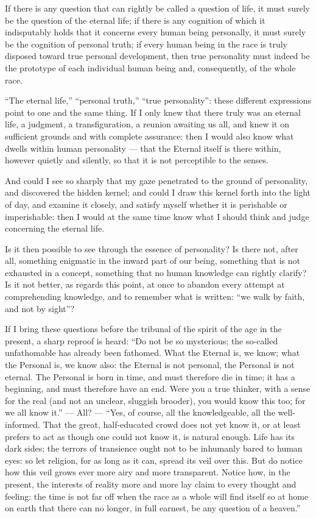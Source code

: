 \documentclass[12pt,a4paper]{book}
\begin{document}
If there is any question that can rightly be called a question of life, it must surely be the question of the eternal life; if there is any cognition of which it indisputably holds that it concerns every human being personally, it must surely be the cognition of personal truth; if every human being in the race is truly disposed toward true personal development, then true personality must indeed be the prototype of each individual human being and, consequently, of the whole race.

``The eternal life,'' ``personal truth,'' ``true personality'': these different expressions point to one and the same thing. If I only knew that there truly was an eternal life, a judgment, a transfiguration, a reunion awaiting us all, and knew it on sufficient grounds and with complete assurance: then I would also know what dwells within human personality --- that the Eternal itself is there within, however quietly and silently, so that it is not perceptible to the senses.

And could I see so sharply that my gaze penetrated to the ground of personality, and discovered the hidden kernel; and could I draw this kernel forth into the light of day, and examine it closely, and satisfy myself whether it is
perishable or imperishable: then I would at the same time know what I should think and judge concerning the eternal life.

Is it then possible to see through the essence of personality? Is there not, after all, something enigmatic in the inward part of our being, something that is not exhausted in a concept, something that no human knowledge can rightly clarify? Is it not better, as regards this point, at once to abandon every attempt at comprehending knowledge, and to remember what is written: ``we walk by faith, and not by sight''?

If I bring these questions before the tribunal of the spirit of the age in the present, a sharp reproof is heard: ``Do not be so mysterious; the so-called unfathomable has already been fathomed. What the Eternal is, we know; what the Personal is, we know also: the Eternal is not personal, the Personal is not eternal. The Personal is born in time, and must therefore die in time; it has a beginning, and must therefore have an end. Were you a true thinker, with a sense for the real (and not an unclear, sluggish brooder), you would know this too; for we all know it.'' --- All? --- ``Yes, of course, all the knowledgeable, all the well-informed. That the great, half-educated crowd does not yet know it, or at least prefers to act as though one could not know it, is natural enough. Life has its dark sides; the terrors of transience ought not to be inhumanly bared to human eyes: so let religion, for as long as it can, spread its veil over this. But do notice how this veil grows ever more airy and more transparent. Notice how, in the present, the interests of reality more and more lay claim to every thought and feeling: the time is not far off when the race as a whole will find itself so at home on earth that there can no longer, in full earnest, be any question of a heaven.''
\end{document}

